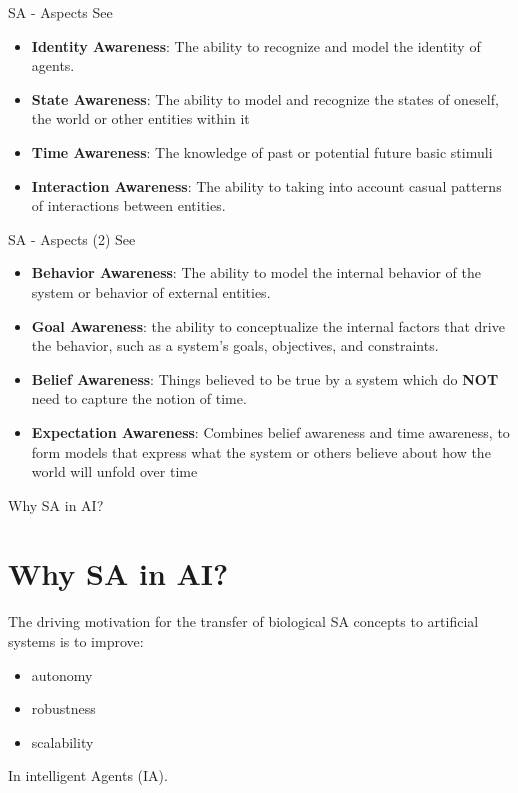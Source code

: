 \documentclass[handout]{beamer}
\begin{document}
\begin{frame}{SA - Aspects}
	See \cite{lewis-2017-towards-a-framework-for-the-levels-and-aspects-of-self-aware-computing-systems}
	\begin{itemize}
		\item \textbf{Identity Awareness}: The ability to recognize and model the identity of agents.
		\item \textbf{State Awareness}: The ability to model and recognize the states of oneself, the world or other entities within it
		\item \textbf{Time Awareness}: The knowledge of past or potential future basic stimuli
		\item \textbf{Interaction Awareness}: The ability to taking into account casual patterns of
		interactions between entities.
	\end{itemize}
\end{frame}

\begin{frame}{SA - Aspects (2)}
	See \cite{lewis-2017-towards-a-framework-for-the-levels-and-aspects-of-self-aware-computing-systems}
	\begin{itemize}
		\item \textbf{Behavior Awareness}: The ability to model the internal behavior of the system
		or behavior of external entities.
		\item \textbf{Goal Awareness}: the ability to conceptualize the internal factors that drive the behavior, such as a system’s goals, objectives, and constraints.
		\item \textbf{Belief Awareness}: Things believed to be true by a system which do \textbf{NOT} need to capture the notion of time.
		\item \textbf{Expectation Awareness}: Combines belief awareness and time awareness, to form models that express what the system or others believe about how the world will unfold over time
	\end{itemize}
\end{frame}

\begin{frame}{Why SA in AI?}
	\section{Why SA in AI?} The driving motivation for the transfer of biological SA concepts
	to artificial systems is to improve:
	\begin{itemize}
		\item autonomy
		\item robustness
		\item scalability
	\end{itemize}
	In intelligent Agents (IA).
\end{frame}
\end{document}
